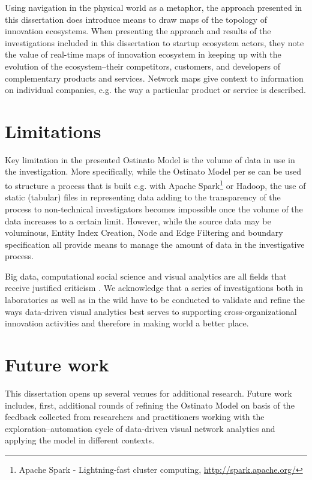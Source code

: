 Using navigation in the physical world as a metaphor, the approach presented in this dissertation does introduce means to draw maps of the topology of innovation ecosystems. When presenting the approach and results of the investigations included in this dissertation to startup ecosystem actors, they note the value of real-time maps of innovation ecosystem in keeping up with the evolution of the ecosystem--their competitors, customers, and developers of complementary products and services. Network maps give context to information on individual companies, e.g. the way a particular product or service is described.

\section{Limitations}

Key limitation in the presented Ostinato Model is the volume of data in use in the investigation. More specifically, while the Ostinato Model per se can be used to structure a process that is built e.g. with Apache Spark\footnote{Apache Spark - Lightning-fast cluster computing, \url{http://spark.apache.org/}} or Hadoop, the use of static (tabular) files in representing data adding to the transparency of the process to non-technical investigators becomes impossible once the volume of the data increases to a certain limit. However, while the source data may be voluminous, Entity Index Creation, Node and Edge Filtering and boundary specification all provide means to manage the amount of data in the investigative process.

Big data, computational social science and visual analytics are all fields that receive justified criticism \citep[cf.][]{boyd2012CriticalData}. We acknowledge that a series of investigations both in laboratories as well as in the wild have to be conducted to validate and refine the ways data-driven visual analytics best serves to supporting cross-organizational innovation activities and therefore in making world a better place.

\section{Future work}

This dissertation opens up several venues for additional research. Future work includes, first, additional rounds of refining the Ostinato Model on basis of the feedback collected from researchers and practitioners working with the exploration–automation cycle of data-driven visual network analytics and applying the model in different contexts.

